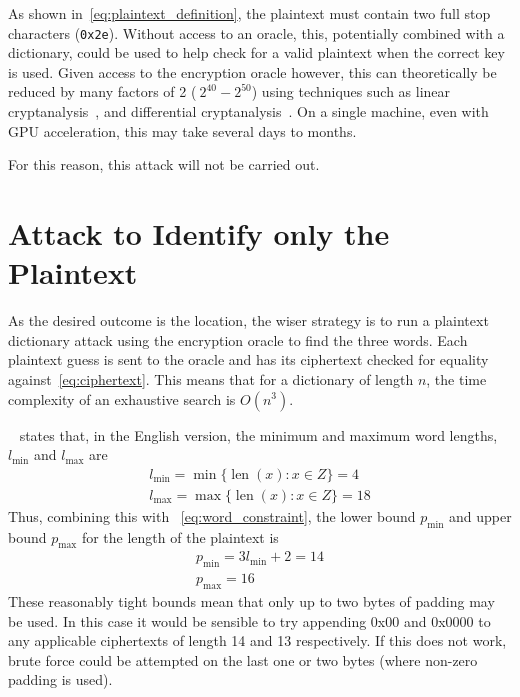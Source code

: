 \documentclass[11pt]{article}
\DeclareMathOperator{\len}{len}
\begin{document}
\begin{multicols*}{2}
        As shown in~\eqref{eq:plaintext_definition}, the plaintext must contain two full stop characters (\texttt{0x2e}).
        Without access to an oracle, this, potentially combined with a dictionary, could be used to help check for a valid plaintext when the correct key is used.
        Given access to the encryption oracle however, this can theoretically be reduced by many factors of 2 ($~2^{40}-2^{50}$) using techniques such as linear cryptanalysis~\cite{matsui1993linear}, and differential cryptanalysis~\cite{biham1992differential}.
        On a single machine, even with GPU acceleration, this may take several days to months.

        For this reason, this attack will not be carried out.


        \section{Attack to Identify only the Plaintext}\label{sec:plaintext-identification-attack}
        As the desired outcome is the  location, the wiser strategy is to run a plaintext dictionary attack using the encryption oracle to find the three words.
        Each plaintext guess is sent to the oracle and has its ciphertext checked for equality against~\eqref{eq:ciphertext}.
        This means that for a dictionary of length $n$, the time complexity of an exhaustive search is $O(n^3)$.

        ~\cite{what3words_support} states that, in the English version, the minimum and maximum word lengths, $l_{\min}$ and $l_{\max}$ are
        \begin{gather*}
            l_{\min} = \min\{ \len(x) : x \in Z \} = 4\\
            l_{\max} = \max\{ \len(x) : x \in Z \} = 18
        \end{gather*}
        Thus, combining this with ~\eqref{eq:word_constraint}, the lower bound $p_{\min}$ and upper bound $p_{\max}$ for the length of the plaintext is
        \begin{gather*}
            p_{\min} = 3l_{\min} + 2 = 14\\
            p_{\max} = 16
        \end{gather*}
        These reasonably tight bounds mean that only up to two bytes of padding may be used.
        In this case it would be sensible to try appending 0x00 and 0x0000 to any applicable ciphertexts of length 14 and 13 respectively.
        If this does not work, brute force could be attempted on the last one or two bytes (where non-zero padding is used).


\end{multicols*}
\end{document}
